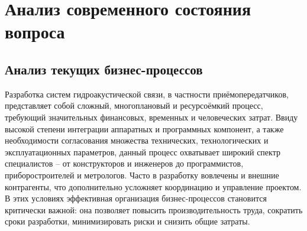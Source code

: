 \documentclass[
    numbers=section,
    document-code={ВКРБ--09.03.04--10.19--XX--26--81}
]{../latex/fqw}
\begin{document}
    \section{Анализ современного состояния вопроса}\label{sec:analysis_of_current_state_of_issue}

    \subsection{Анализ текущих бизнес-процессов}\label{subsec:business_process_analysis}
    \vspace{\baselineskip}

    Разработка систем гидроакустической связи, в частности приёмопередатчиков,
    представляет собой сложный, многоплановый и ресурсоёмкий процесс,
    требующий значительных финансовых, временных и человеческих затрат.
    Ввиду высокой степени интеграции аппаратных и программных компонент,
    а также необходимости согласования множества технических, технологических и эксплуатационных параметров,
    данный процесс охватывает широкий спектр специалистов --
    от конструкторов и инженеров до программистов, приборостроителей и метрологов.
    Часто в разработку вовлечены и внешние контрагенты, что дополнительно усложняет координацию и управление проектом.
    В этих условиях эффективная организация бизнес-процессов становится критически важной:
    она позволяет
    повысить производительность труда,
    сократить сроки разработки,
    минимизировать риски и
    снизить общие затраты.
\end{document}
